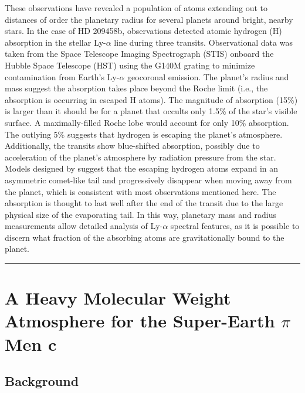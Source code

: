 \documentclass[onecolumn]{aastex63}
\begin{document}
These observations have revealed a population of atoms extending out to distances of order the planetary radius for several planets around bright, nearby stars. In the case of HD 209458b, observations detected atomic hydrogen (H) absorption in the stellar Ly-$\alpha$ line during three transits. Observational data was taken from the Space Telescope Imaging Spectrograph (STIS) onboard the Hubble Space Telescope (HST) using the G140M grating to minimize contamination from Earth's Ly-$\alpha$ geocoronal emission. The planet's radius and mass suggest the absorption takes place beyond the Roche limit (i.e., the absorption is occurring in escaped H atoms). The magnitude of absorption (15\%) is larger than it should be for a planet that occults only 1.5\% of the star's visible surface. A maximally-filled Roche lobe would account for only 10\% absorption. The outlying 5\% suggests that hydrogen is escaping the planet's atmosphere. Additionally, the transits show blue-shifted absorption, possibly due to acceleration of the planet’s atmosphere by radiation pressure from the star. Models designed by \citet{2003Natur.422..143V} suggest that the escaping hydrogen atoms expand in an asymmetric comet-like tail and progressively disappear when moving away from the planet, which is consistent with most observations mentioned here. The absorption is thought to last well after the end of the transit due to the large physical size of the evaporating tail. In this way, planetary mass and radius measurements allow detailed analysis of Ly-$\alpha$ spectral features, as it is possible to discern what fraction of the absorbing atoms are gravitationally bound to the planet.

\vspace{1cm}
\hrule
\vspace{1cm}

\section{A Heavy Molecular Weight Atmosphere for the Super-Earth $\pi$ Men c}
\begin{centering}

\cite{2021ApJ...907L..36M}

\end{centering}


\subsection{Background}
\end{document}
